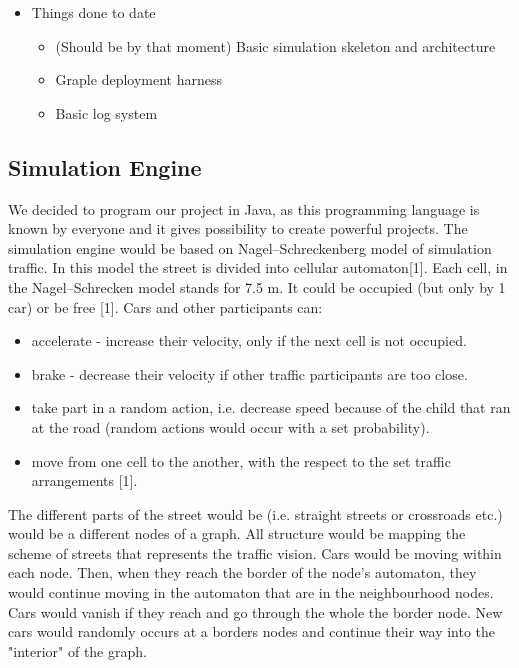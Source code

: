 \begin{itemize}
\begin{itemize}
	\end{itemize}

	\item Things done to date
	\begin{itemize}
		\item (Should be by that moment) Basic simulation skeleton and architecture
		\item Graple deployment harness
		\item Basic log system
	\end{itemize}

\end{itemize}

\subsection{Simulation Engine} 

We decided to program our project in Java, as this programming language is known by everyone and it gives possibility to create powerful projects. The simulation engine would be based on Nagel–Schreckenberg model of simulation traffic. In this model the street is divided into cellular automaton[1]. Each cell, in the Nagel–Schrecken model stands for 7.5 m. It could be occupied (but only by 1 car) or be free [1]. Cars and other participants can:
	\begin{itemize}
		\item accelerate - increase their velocity, only if the next cell is not occupied.
		\item brake - decrease their  velocity if other traffic participants are too close. 
		\item take part in a random action, i.e. decrease speed because of the child that ran at the road (random actions would occur with a set probability). 
		\item move from one cell to the another, with the respect to the set traffic arrangements [1]. 
	\end{itemize}
	
The different parts of the street would be (i.e. straight streets or crossroads etc.) would be a different nodes of a graph. All structure would be mapping the scheme of streets that represents the traffic vision. Cars would be moving within each node. Then, when they reach the border of the node's automaton, they  would continue moving in the automaton that are in the neighbourhood nodes. Cars would vanish if they reach and go through the whole the border node.  New cars would randomly occurs at a borders nodes and continue their way into the "interior" of the graph. 

